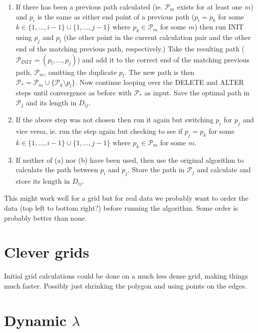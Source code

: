 \documentclass[a4paper,10pt]{article}
\begin{document}
\begin{enumerate}
\begin{enumerate}
\item If there has been a previous path calculated (ie. $\mathcal{P}_m$ exists for at least one $m$) and $p_i$ is the same as either end point of a previous path ($p_i=p_{k}$ for some $k \in \{1,\dots, i-1\} \cup \{1,\dots, j-1\}$ where $p_k \in \mathcal{P}_m$ for some $m$) then run INIT using $p_j$ and $p_l$ (the other point in the current calculation pair and the other end of the matching previous path, respectively.) Take the resulting path ($\mathcal{P}_\text{INIT}=(p_l, \dots, p_j)$) and add it to the correct end of the matching previous path, $\mathcal{P}_m$, omitting the duplicate $p_l$. The new path is then $\mathcal{P}_*= \mathcal{P}_m \cup \{\mathcal{P}_k \setminus p_l\}$. Now continue looping over the DELETE and ALTER steps until convergence as before with $\mathcal{P}_*$ as input. Save the optimal path in $\mathcal{P}_j$ and its length in $D_{ij}$.

\item If the above step was not chosen then run it again but switching $p_i$ for $p_j$ and vice versa, ie. run the step again but checking to see if $p_j =p_{k}$ for some $k \in \{1,\dots, i-1\} \cup \{1,\dots, j-1\}$ where $p_k \in \mathcal{P}_m$ for some $m$.

\item If neither of (a) nor (b) have been used, then use the original algorithm to calculate the path between $p_i$ and $p_j$. Store the path in $\mathcal{P}_{j}$ and calculate and store its length in $D_{ij}$.

\end{enumerate}
\end{enumerate}

This might work well for a grid but for real data we probably want to order the data (top left to bottom right?) before running the algorithm. Some order is probably better than none.



\section{Clever grids}

Initial grid calculations could be done on a much less dense grid, making things much faster. Possibly just shrinking the polygon and using points on the edges.

\section{Dynamic $\lambda$}
\end{document}
